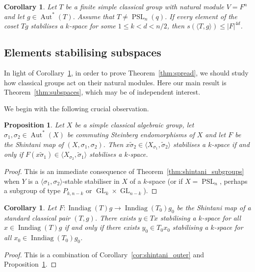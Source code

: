 \documentclass[11pt]{article}
\numberwithin{equation}{section}
\theoremstyle{shdefinition}
\theoremstyle{shplain}
\newtheorem{corollary}[definition]{Corollary}
\newtheorem{proposition}[definition]{Proposition}
\newcommand{\s}{\sigma}
\newcommand{\ws}{\widetilde{\sigma}}
\newcommand{\<}{\langle}
\renewcommand{\>}{\rangle}
\renewcommand{\leq}{\leqslant}
\newcommand{\Aut}{\operatorname{Aut}}
\newcommand{\Inndiag}{\operatorname{Inndiag}}
\renewcommand{\:}{\colon}
\newcommand{\GL}{\operatorname{GL}}
\newcommand{\PSL}{\operatorname{PSL}}
\begin{document}
\begin{corollary} \label{cor:subspaces_spread}
Let $T$ be a finite simple classical group with natural module $V = F^n$ and let $g \in \Aut^*(T)$. Assume that $T \neq \PSL_n(q)$. If every element of the coset $Tg$ stabilises a $k$-space for some $1 \leq k < d < n/2$, then $s(\<T,g\>) \leq |F|^{4d}$.
\end{corollary}


\subsection{Elements stabilising subspaces} \label{ss:subspaces}

In light of Corollary~\ref{cor:subspaces_spread}, in order to prove Theorem~\ref{thm:spread}, we should study how classical groups act on their natural modules. Here our main result is Theorem~\ref{thm:subspaces}, which may be of independent interest.

We begin with the following crucial observation.

\begin{proposition} \label{prop:subspaces_shintani}
Let $X$ be a simple classical algebraic group, let $\s_1,\s_2 \in \Aut^*(X)$ be commuting Steinberg endomorphisms of $X$ and let $F$ be the Shintani map of $(X,\s_1,\s_2)$. Then $x\ws_2 \in \< X_{\s_1}, \ws_2 \>$ stabilises a $k$-space if and only if $F(x\ws_1) \in \< X_{\s_2}, \ws_1 \>$ stabilises a $k$-space.
\end{proposition}

\begin{proof}
This is an immediate consequence of Theorem~\ref{thm:shintani_subgroups} when $Y$ is a $\<\s_1,\s_2\>$-stable stabiliser in $X$ of a $k$-space (or if $X=\PSL_n$, perhaps a subgroup of type $P_{k,n-k}$ or $\GL_k \times \GL_{n-k}$).
\end{proof}

\begin{corollary} \label{cor:subspaces_shintani}
Let $F\:\Inndiag(T)g \to \Inndiag(T_0)g_0$ be the Shintani map of a standard classical pair $(T,g)$. There exists $y \in Tx$ stabilising a $k$-space for all $x \in \Inndiag(T)g$ if and only if there exists $y_0 \in T_0x_0$ stabilising a $k$-space for all $x_0 \in \Inndiag(T_0)g_0$.
\end{corollary}

\begin{proof}
This is a combination of Corollary~\ref{cor:shintani_outer} and Proposition~\ref{prop:subspaces_shintani}.
\end{proof}
\end{document}
